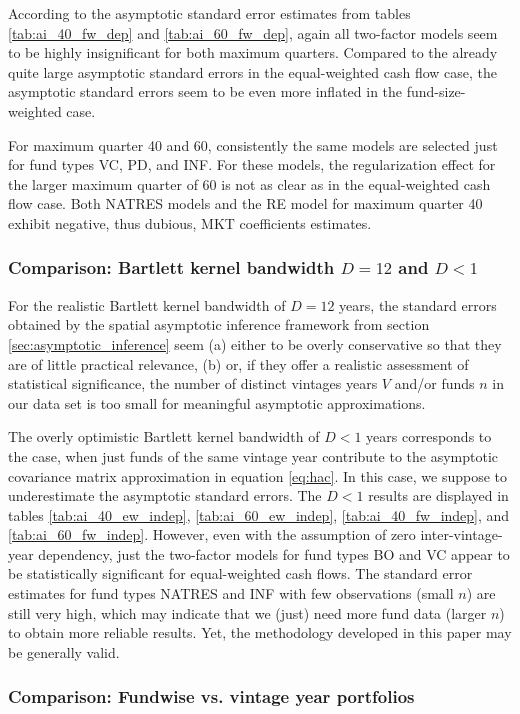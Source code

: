 \documentclass[12pt]{article}
\begin{document}
According to the asymptotic standard error estimates from tables \ref{tab:ai_40_fw_dep} and \ref{tab:ai_60_fw_dep}, again all two-factor models seem to be highly insignificant for both maximum quarters.
Compared to the already quite large asymptotic standard errors in the equal-weighted cash flow case, the asymptotic standard errors seem to be even more inflated in the fund-size-weighted case.

For maximum quarter 40 and 60, consistently the same models are selected just for fund types VC, PD, and INF.
For these models, the regularization effect for the larger maximum quarter of 60 is not as clear as in the equal-weighted cash flow case.
Both NATRES models and the RE model for maximum quarter 40 exhibit negative, thus dubious, MKT coefficients estimates.

\subsubsection*{Comparison: Bartlett kernel bandwidth $D=12$ and $D<1$}

For the realistic Bartlett kernel bandwidth of $D=12$ years, the standard errors obtained by the spatial asymptotic inference framework from section \ref{sec:asymptotic_inference} seem (a) either to be overly conservative so that they are of little practical relevance, (b) or, if they offer a realistic assessment of statistical significance, the number of distinct vintages years $V$ and/or funds $n$ in our data set is too small for meaningful asymptotic approximations.

The overly optimistic Bartlett kernel bandwidth of $D<1$ years corresponds to the case, when just funds of the same vintage year contribute to the asymptotic covariance matrix approximation in equation \ref{eq:hac}.
In this case, we suppose to underestimate the asymptotic standard errors.
The $D<1$ results are displayed in tables \ref{tab:ai_40_ew_indep}, \ref{tab:ai_60_ew_indep}, \ref{tab:ai_40_fw_indep}, and \ref{tab:ai_60_fw_indep}.
However, even with the assumption of zero inter-vintage-year dependency, just the two-factor models for fund types BO and VC appear to be statistically significant for equal-weighted cash flows.
The standard error estimates for fund types NATRES and INF with few observations (small $n$) are still very high, which may indicate that we (just) need more fund data (larger $n$) to obtain more reliable results.
Yet, the methodology developed in this paper may be generally valid.


\subsubsection*{Comparison: Fundwise vs. vintage year portfolios}
\end{document}
